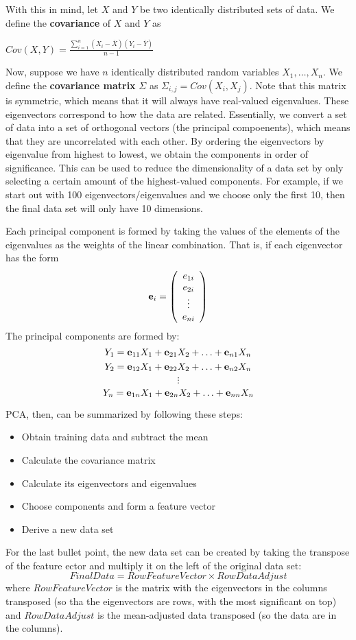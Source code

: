 \documentclass[twocolumn]{article}
\begin{document}
With this in mind, let $X$ and $Y$ be two identically distributed sets of data. We define the \textbf{covariance} of $X$ and $Y$ as
\begin{center}
$Cov(X, Y) = 
\frac{\sum_{i=1}^{n}(X_i-\overline{X})(Y_i-\overline{Y})}{n-1}$
\end{center}
Now, suppose we have $n$ identically distributed random variables $X_1, \ldots, X_n$. We define the \textbf{covariance matrix} $\Sigma$ as $\Sigma_{i, j} = Cov(X_i, X_j)$. Note that this matrix is symmetric, which means that it will always have real-valued eigenvalues. These eigenvectors correspond to how the data are related. Essentially, we convert a set of data into a set of orthogonal vectors (the principal compoenents), which means that they are uncorrelated with each other. By ordering the eigenvectors by eigenvalue from highest to lowest, we obtain the components in order of significance. This can be used to reduce the dimensionality of a data set by only selecting a certain amount of the highest-valued components. For example, if we start out with 100 eigenvectors/eigenvalues and we choose only the first 10, then the final data set will only have 10 dimensions.

Each principal component is formed by taking the values of the elements of the eigenvalues as the weights of the linear combination. That is, if each eigenvector has the form
$${\bf e}_{i} = \left(\begin{array}{c} e_{1i} \\ e_{2i} \\ \vdots \\ e_{ni} \end{array}\right)$$
The principal components are formed by:
$$Y_1 = {\bf e}_{11}X_1 + {\bf e}_{21}X_2 + \ldots + {\bf e}_{n1}X_n$$
$$Y_2 = {\bf e}_{12}X_1 + {\bf e}_{22}X_2 + \ldots + {\bf e}_{n2}X_n$$
$$\vdots$$
$$Y_n = {\bf e}_{1n}X_1 + {\bf e}_{2n}X_2 + \ldots + {\bf e}_{nn}X_n$$

PCA, then, can be summarized by following these steps:
\begin{itemize}
    \item Obtain training data and subtract the mean
    \item Calculate the covariance matrix
    \item Calculate its eigenvectors and eigenvalues
    \item Choose components and form a feature vector
    \item Derive a new data set
\end{itemize}
For the last bullet point, the new data set can be created by taking the transpose of the feature ector and multiply it on the left of the original data set:
$$FinalData = RowFeatureVector \times RowDataAdjust$$
where $RowFeatureVector$ is the matrix with the eigenvectors in the columns transposed (so tha the eigenvectors are rows, with the most significant on top) and $RowDataAdjust$ is the mean-adjusted data transposed (so the data are in the columns). 
\end{document}
